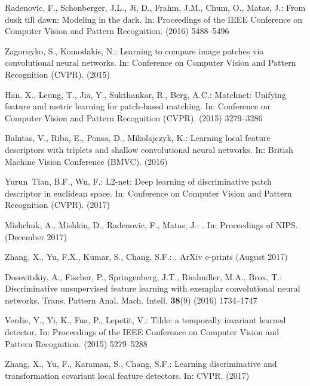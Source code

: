 \documentclass[runningheads]{llncs}
\begin{document}
{\begin{thebibliography}{10}
Radenovic, F., Schonberger, J.L., Ji, D., Frahm, J.M., Chum, O., Matas, J.:
\newblock From dusk till dawn: Modeling in the dark.
\newblock In: Proceedings of the IEEE Conference on Computer Vision and Pattern
  Recognition. (2016)  5488--5496

Zagoruyko, S., Komodakis, N.:
\newblock Learning to compare image patches via convolutional neural networks.
\newblock In: Conference on Computer Vision and Pattern Recognition {(CVPR)}.
  (2015)

Han, X., Leung, T., Jia, Y., Sukthankar, R., Berg, A.C.:
\newblock Matchnet: Unifying feature and metric learning for patch-based
  matching.
\newblock In: Conference on Computer Vision and Pattern Recognition {(CVPR)}.
  (2015)  3279--3286

Balntas, V., Riba, E., Ponsa, D., Mikolajczyk, K.:
\newblock Learning local feature descriptors with triplets and shallow
  convolutional neural networks.
\newblock In: British Machine Vision Conference {(BMVC)}. (2016)

Yurun~Tian, B.F., Wu, F.:
\newblock L2-net: Deep learning of discriminative patch descriptor in euclidean
  space.
\newblock In: Conference on Computer Vision and Pattern Recognition (CVPR).
  (2017)

Mishchuk, A., Mishkin, D., Radenovic, F., Matas, J.:
.
\newblock In: Proceedings of NIPS. (December 2017)

{Zhang}, X., {Yu}, F.X., {Kumar}, S., {Chang}, S.F.:
.
\newblock ArXiv e-prints (August 2017)

Dosovitskiy, A., Fischer, P., Springenberg, J.T., Riedmiller, M.A., Brox, T.:
\newblock Discriminative unsupervised feature learning with exemplar
  convolutional neural networks.
 Trans. Pattern Anal. Mach. Intell. \textbf{38}(9) (2016)
  1734--1747

Verdie, Y., Yi, K., Fua, P., Lepetit, V.:
\newblock Tilde: a temporally invariant learned detector.
\newblock In: Proceedings of the IEEE Conference on Computer Vision and Pattern
  Recognition. (2015)  5279--5288

Zhang, X., Yu, F., Karaman, S., Chang, S.F.:
\newblock Learning discriminative and transformation covariant local feature
  detectors.
\newblock In: CVPR. (2017)


\end{thebibliography}}
\end{document}
